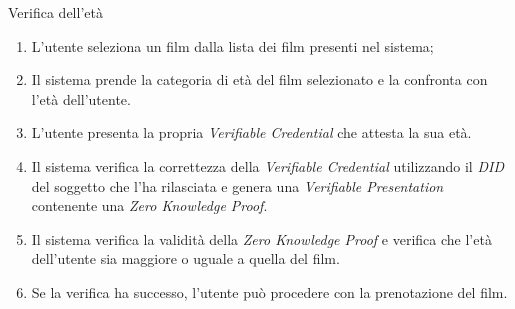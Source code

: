 \begin{usecase}{7}{Verifica dell'età}\label{uc:verifica-eta}
  \usecasemain{}
  
  \begin{enumerate}
    \item L'utente seleziona un film dalla lista dei film presenti nel sistema;
    \item Il sistema prende la categoria di età del film selezionato e la confronta con l'età dell'utente.
    \item L'utente presenta la propria \textit{Verifiable Credential} che attesta la sua età.
    \item Il sistema verifica la correttezza della \textit{Verifiable Credential} utilizzando il \textit{DID} del soggetto che l'ha rilasciata e genera una \textit{Verifiable Presentation} contenente una \textit{Zero Knowledge Proof}.
    \item Il sistema verifica la validità della \textit{Zero Knowledge Proof} e verifica che l'età dell'utente sia maggiore o uguale a quella del film.
    \item Se la verifica ha successo, l'utente può procedere con la prenotazione del film.
  \end{enumerate}
\end{usecase}

